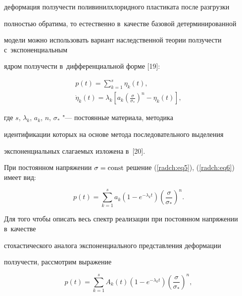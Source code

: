 деформация ползучести поливинилхлоридного пластиката после разгрузки 

полностью обратима, то естественно в~качестве базовой детерминированной 

модели можно использовать вариант наследственной теории ползучести с~экспоненциальным 

ядром ползучести в~дифференциальной форме [19]:

\begin{gather}

\label{radch:eq5}

p\left( t \right) = \sum\limits_{k = 1}^s {\eta _k \left( t \right)} ,\\

\label{radch:eq6}

\dot {\eta }_k \left( t \right) = \lambda _k \left[ {a_k \left( 

{\frac{\sigma }{\sigma _ * }} \right)^n - \eta _k \left( t \right)} 

\right],

\end{gather}

где $s$, $\lambda _k$, $a_k$, $n$, $\sigma _ * $ "--- постоянные материала, методика 

идентификации которых на основе метода последовательного выделения 

экспоненциальных слагаемых изложена в~[20].



При постоянном напряжении $\sigma = \rm const$ решение (\ref{radch:eq5}), (\ref{radch:eq6}) имеет вид:

\begin{equation}

\label{radch:eq7}

p\left( t \right) = \sum\limits_{k = 1}^s {a_k \left( {1 - e^{ - \lambda _k 

t}} \right)\left( {\frac{\sigma }{\sigma _ * }} \right)^n} .

\end{equation}



Для того чтобы описать весь спектр реализации при постоянном напряжении в~качестве 

стохастического аналога экспоненциального представления деформации 

ползучести, рассмотрим выражение

\begin{equation}

\label{radch:eq8}

p\left( t \right) = \sum\limits_{k = 1}^s {A_k \left( t \right)\left( {1 - 

e^{ - \lambda _k t}} \right)\left( {\frac{\sigma }{\sigma _ * }} \right)^n} ,

\end{equation}

